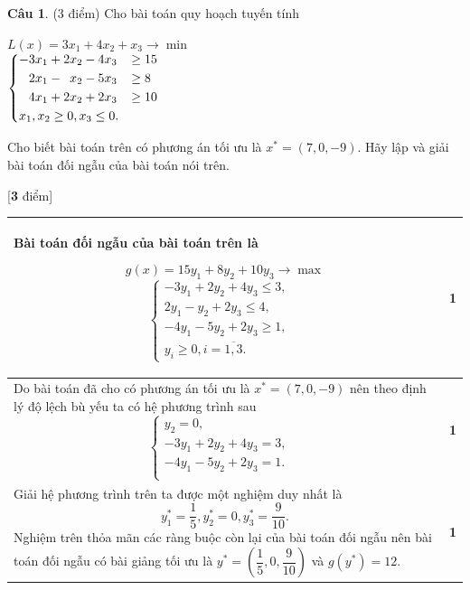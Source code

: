 \documentclass[12pt,a4letter]{article}
\theoremstyle{definition}
\newtheorem{cauhoi}{Câu}
\newenvironment{phandiem}{%
\par\noindent
\begin{longtable}[t]{|p{15cm}|p{1.2cm}|}
\hline
}{%
\end{longtable}
}
\newcommand\diem[1]{ & \hfil \textbf{#1} \\ \hline}
\newcommand\tongdiem[1]{\hfill [\textbf{#1} điểm]}
\begin{document}
\begin{cauhoi}%
(3 điểm)  
Cho bài toán quy hoạch tuyến tính
\begin{center}
$ L(x)=3x_1+4x_2+x_3\rightarrow\min $ \\
 $ \begin{dcases}
-3x_1+2x_2-4x_3&\ge 15\\ 
\phantom{-}2x_1-\phantom{2}x_2-5x_3&\ge 8\\ 
\phantom{-}4x_1+2x_2+2x_3&\ge 10\\ 
x_1, x_2\ge 0, x_3\le 0.&\\ 
\end{dcases} $
\end{center}
Cho biết bài toán trên có phương án tối ưu là $x^*=(7,0,-9)$.
Hãy lập và giải bài toán đối ngẫu của bài toán nói trên.

\begin{traloi}\tongdiem{3}
\begin{phandiem}
Bài toán đối ngẫu của bài toán trên là
\begin{center}
$$g(x)=15y_1+8y_2+10y_3\rightarrow\max$$
$$\begin{cases}
-3y_1+2y_2+4y_3\le 3,&\\
2y_1-y_2+2y_3\le 4,&\\
-4y_1-5y_2+2y_3\ge 1,&\\
y_i\ge 0, i=\overline{1,3}.&
\end{cases}$$
\end{center}
\diem{1}
Do bài toán đã cho có phương án tối ưu là $x^*=(7,0,-9)$ nên theo định lý độ lệch bù yếu ta có hệ phương trình sau
$$\begin{cases}
y_2=0,&\\
-3y_1+2y_2+4y_3=3,&\\
-4y_1-5y_2+2y_3=1.&\\
\end{cases}$$
\diem{1}
Giải hệ phương trình trên ta được một nghiệm duy nhất là
$$y_1^*=\dfrac{1}{5}, y_2^*=0, y_3^*=\dfrac{9}{10}.$$
Nghiệm trên thỏa mãn các ràng buộc còn lại của bài toán đối ngẫu nên bài toán đối ngẫu có bài giảng tối ưu là $y^*=(\dfrac{1}{5},0,\dfrac{9}{10})$ và $g(y^*)=12$.
\diem{1}
\end{phandiem}
\end{traloi}
\end{cauhoi}
\end{document}
